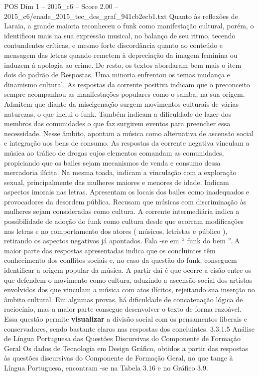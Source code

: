 \begin{textsample}{POS Dim 1 – 2015\_c6 – Score 2.00 – 2015\_c6/enade\_2015\_tec\_des\_graf\_941cb2ecb1.txt}
Quanto às reflexões de Laraia, a grande maioria reconheceu o funk como manifestação cultural, porém, o identificou mais na sua expressão musical, no balanço de seu ritmo, tecendo contundentes críticas, e mesmo forte discordância quanto ao conteúdo e mensagem das letras quando remetem à depreciação da imagem feminina ou induzem à apologia ao crime.
De resto, os textos abordaram bem mais o item dois do padrão de Respostas.
Uma minoria enfrentou os temas mudança e dinamismo cultural.
As respostas da corrente positiva indicam que o preconceito sempre acompanhou as manifestações populares como o samba, na sua origem.
Admitem que diante da miscigenação surgem movimentos culturais de várias naturezas, o que inclui o funk.
Também indicam a dificuldade de lazer dos membros das comunidades o que faz surgirem eventos para preencher essa necessidade.
Nesse âmbito, apontam a música como alternativa de ascensão social e integração aos bens de consumo.
As respostas da corrente negativa vinculam a música ao tráfico de drogas cujos elementos comandam as comunidades, propiciando que os bailes sejam mecanismos de venda e consumo dessa mercadoria ilícita.
Na mesma toada, indicam a vinculação com a exploração sexual, principalmente das mulheres maiores e menores de idade.
Indicam aspectos imorais nas letras.
Apresentam os locais dos bailes como inadequados e provocadores da desordem pública.
Recusam que músicas com discriminação às mulheres sejam consideradas como cultura.
A corrente intermediária indica a possibilidade de adoção do funk como cultura desde que ocorram modificações nas letras e no comportamento dos atores ( músicos, letristas e público ), retirando os aspectos negativos já apontados.
Fala -se em “ funk do bem ”.
A maior parte das respostas apresentadas indica que os concluintes têm conhecimento dos conflitos sociais e, no caso da questão do funk, conseguem identificar a origem popular da música.
A partir daí é que ocorre a cisão entre os que defendem o movimento como cultura, aduzindo a ascensão social dos artistas envolvidos dos que vinculam a música com atos ilícitos, rejeitando sua inserção no âmbito cultural.
Em algumas provas, há dificuldade de concatenação lógica de raciocínio, mas a maior parte consegue desenvolver o texto de forma razoável.
Essa questão permite \textbf{visualizar} a divisão social com os pensamentos liberais e conservadores, sendo bastante claros nas respostas dos concluintes. 3.3.1.5 Análise de Língua Portuguesa das Questões Discursivas do Componente de Formação Geral Os dados de Tecnologia em Design Gráfico, obtidos a partir das respostas às questões discursivas do Componente de Formação Geral, no que tange à Língua Portuguesa, encontram -se na Tabela 3.16 e no Gráfico 3.9.

\end{textsample}
